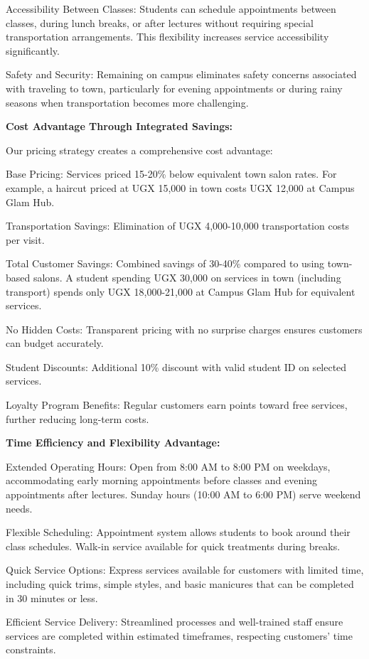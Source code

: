 Accessibility Between Classes: Students can schedule appointments between classes, during lunch breaks, or after lectures without requiring special transportation arrangements. This flexibility increases service accessibility significantly.

Safety and Security: Remaining on campus eliminates safety concerns associated with traveling to town, particularly for evening appointments or during rainy seasons when transportation becomes more challenging.

\textbf{Cost Advantage Through Integrated Savings:}

Our pricing strategy creates a comprehensive cost advantage:

Base Pricing: Services priced 15-20\% below equivalent town salon rates. For example, a haircut priced at UGX 15,000 in town costs UGX 12,000 at Campus Glam Hub.

Transportation Savings: Elimination of UGX 4,000-10,000 transportation costs per visit.

Total Customer Savings: Combined savings of 30-40\% compared to using town-based salons. A student spending UGX 30,000 on services in town (including transport) spends only UGX 18,000-21,000 at Campus Glam Hub for equivalent services.

No Hidden Costs: Transparent pricing with no surprise charges ensures customers can budget accurately.

Student Discounts: Additional 10\% discount with valid student ID on selected services.

Loyalty Program Benefits: Regular customers earn points toward free services, further reducing long-term costs.

\textbf{Time Efficiency and Flexibility Advantage:}

Extended Operating Hours: Open from 8:00 AM to 8:00 PM on weekdays, accommodating early morning appointments before classes and evening appointments after lectures. Sunday hours (10:00 AM to 6:00 PM) serve weekend needs.

Flexible Scheduling: Appointment system allows students to book around their class schedules. Walk-in service available for quick treatments during breaks.

Quick Service Options: Express services available for customers with limited time, including quick trims, simple styles, and basic manicures that can be completed in 30 minutes or less.

Efficient Service Delivery: Streamlined processes and well-trained staff ensure services are completed within estimated timeframes, respecting customers' time constraints.

